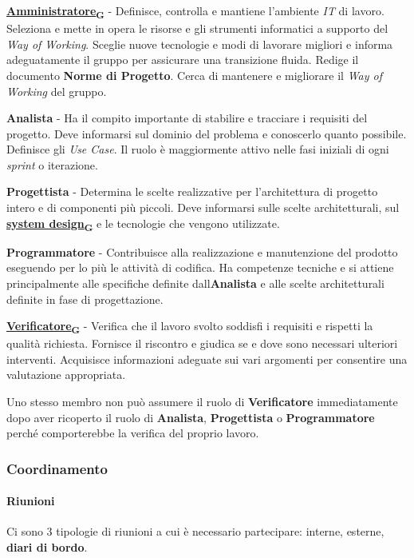 \documentclass[12pt, a4paper]{article}
\newcommand{\urlglossario}{https://skynetunigroup.github.io/Code_Guardian/Documentazione/PB/glossario_v2.0.0.pdf} %
\newcommand{\glo}[2]{\href{\urlglossario\#nameddest=#2}{#1\textsubscript{G}}}
\begin{document}
 \textbf{\glo{Amministratore}{amministratore}} - Definisce, controlla e mantiene l'ambiente \textit{IT} di lavoro. Seleziona e mette in opera le risorse e gli strumenti informatici a supporto del \textit{Way of Working}. Sceglie nuove tecnologie e modi di lavorare migliori e informa adeguatamente il gruppo per assicurare una transizione fluida. Redige il documento \textbf{Norme di Progetto}. Cerca di mantenere e migliorare il \textit{Way of Working} del gruppo.
 
 \textbf{Analista} - Ha il compito importante di stabilire e tracciare i requisiti del progetto. Deve informarsi sul dominio del problema e conoscerlo quanto possibile. Definisce gli \textit{Use Case}. Il ruolo è maggiormente attivo nelle fasi iniziali di ogni \textit{sprint} o iterazione.
 
 \textbf{Progettista} - Determina le scelte realizzative per l'architettura di progetto intero e di componenti più piccoli. Deve informarsi sulle scelte architetturali, sul \textbf{\glo{system design}{system-design}} e le tecnologie che vengono utilizzate.
 
 \textbf{Programmatore} - Contribuisce alla realizzazione e manutenzione del prodotto eseguendo per lo più le attività di codifica. Ha competenze tecniche e si attiene principalmente alle specifiche definite dall\textquotesingle \textbf{Analista} e alle scelte architetturali definite in fase di progettazione.
 
 \textbf{\glo{Verificatore}{verificatore}} - Verifica che il lavoro svolto soddisfi i requisiti e rispetti la qualità richiesta. Fornisce il riscontro e giudica se e dove sono necessari ulteriori interventi. Acquisisce informazioni adeguate sui vari argomenti per consentire una valutazione appropriata.
 
 Uno stesso membro non può assumere il ruolo di \textbf{Verificatore} immediatamente dopo aver ricoperto il ruolo di \textbf{Analista}, \textbf{Progettista} o \textbf{Programmatore} perché comporterebbe la verifica del proprio lavoro.

\subsubsection{Coordinamento}

\paragraph{Riunioni}

Ci sono 3 tipologie di riunioni a cui è necessario partecipare: interne, esterne, \textbf{diari di bordo}.
\end{document}
